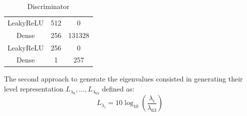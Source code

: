 \documentclass[12pt,pdftex,16x10]{elpres} %
\begin{document}
\begin{psli}
\begin{table}[h]
\begin{minipage}[b][0.5\textheight][b]{0.45\textwidth}
{\begin{tabular}{c c c}
            LeakyReLU             & 512           & 0                 \\
            Dense                 & 256           & 131328            \\
            LeakyReLU             & 256           & 0                 \\
            Dense                 & 1             & 257               \\
        \end{tabular}
        }
        \caption{Discriminator}
      \end{minipage}
    \end{table}
\end{psli}

\begin{psli}
  
    The second approach to generate the eigenvalues consisted in generating their level representation $L_{\lambda_0}, \dots, L_{\lambda_{63}}$ defined as:
    \begin{equation}
        L_{\lambda_i} = 10 \log_{10}(\frac{\lambda_i}{\lambda_{63}})
    \end{equation}


\end{psli}
\end{document}
